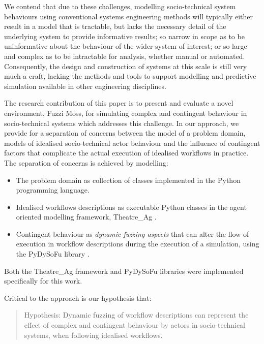 \documentclass{sig-alternate}
\begin{document}
We contend that due to these challenges, modelling socio-technical system behaviours using conventional systems
engineering methods will typically either result in a model that is tractable, but lacks the necessary detail of the
underlying system to provide informative results; so narrow in scope as to be uninformative about the behaviour of the
wider system of interest; or so large and complex as to be intractable for analysis, whether manual or automated.
Consequently, the design and construction of systems at this scale is still very much a craft, lacking the methods and
tools to support modelling and predictive simulation available in other engineering disciplines.

The research contribution of this paper is to present and evaluate a novel environment, Fuzzi Moss, for simulating
complex and contingent behaviour in socio-technical systems which addresses this challenge.  In our approach, we provide
for a separation of concerns between the model of a problem domain, models of idealised socio-technical actor behaviour
and the influence of contingent factors that complicate the actual execution of idealised workflows in practice.  The
separation of concerns is achieved by modelling:

\begin{itemize}

\item The problem domain as collection of classes implemented in the Python programming language.

\item Idealised workflows descriptions as executable Python classes in the agent oriented modelling framework,
  Theatre\_Ag \citep{theatreag}.

\item Contingent behaviour as \emph{dynamic fuzzing aspects} that can alter the flow of execution in workflow
  descriptions during the execution of a simulation, using the PyDySoFu library \citep{wallis2017pydysofu}.

\end{itemize}

Both the Theatre\_Ag framework and PyDySoFu libraries were implemented specifically for this work.

Critical to the approach is our hypothesis that:

\begin{quotation}
  Hypothesis: Dynamic fuzzing of workflow descriptions can represent the effect of complex and contingent behaviour by
  actors in socio-technical systems, when following idealised workflows.
\end{quotation}
\end{document}
